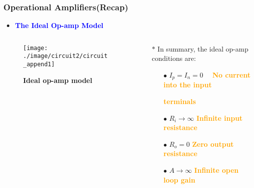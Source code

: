 \documentclass{beamer}
\newcommand{\blue}[1]{\textcolor{blue}{#1}}
\newcommand{\orange}[1]{\textcolor{orange}{#1}}
\begin{document}
\begin{frame}
\frametitle{Operational Amplifiers(Recap)}

\begin{itemize}
  \item {\bf \blue{The Ideal Op-amp Model}}
\end{itemize}

\begin{columns}
\begin{column}{4cm}
\begin{figure}[H]
  \centering
  \texttt{[image: ./image/circuit2/circuit\_append1]}
  \caption{{\bf Ideal op-amp model}}
\end{figure}
\end{column}

\begin{column}{8cm}
\begin{itemize}
  \item[$\ast$] In summary, the ideal op-amp conditions are:
  \begin{itemize}
    \item[$\bullet$] $I_p = I_n = 0$ ~~\orange{\bf No current into the input}
    \item[] \hspace{20 mm}\orange{\bf terminals}
    \item[$\bullet$] $R_i \rightarrow \infty$ \hspace{7 mm}\orange{\bf Infinite input resistance}
    \item[$\bullet$] $R_o = 0$ \hspace{8 mm} \orange{\bf Zero output resistance}
    \item[$\bullet$] $A \rightarrow \infty$ \hspace{8 mm}\orange{\bf Infinite open loop gain}
  \end{itemize}
\end{itemize}
\end{column}
\end{columns}

\end{frame}
\end{document}
